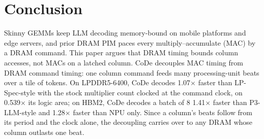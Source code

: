 \section{Conclusion}
\label{sec:conclusion}

Skinny GEMMs keep LLM decoding memory-bound on mobile platforms and edge servers, and prior DRAM PIM paces every
multiply--accumulate (MAC) by a DRAM command. This paper argues that DRAM timing bounds column accesses, not MACs on a
latched column. CoDe decouples MAC timing from DRAM command timing: one column command feeds many processing-unit beats over a tile
of tokens. On LPDDR5-6400, CoDe decodes 1.07$\times$ faster than LP-Spec-style
with the stock multiplier count clocked at the command clock, on 0.539$\times$ its logic area; on HBM2, CoDe decodes a
batch of 8 1.41$\times$ faster than P3-LLM-style and 1.28$\times$ faster than NPU only. Since a
column's beats follow from its period and the clock alone, the decoupling carries over to any DRAM whose column
outlasts one beat.
